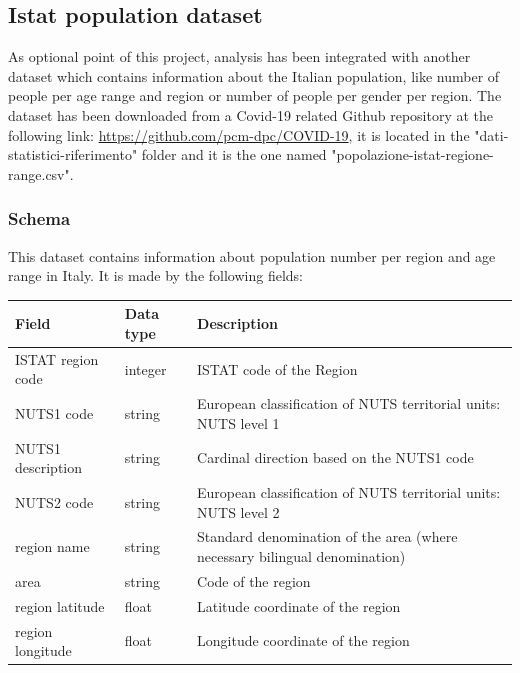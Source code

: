 \documentclass{article}
\begin{document}

\newpage
\subsection{Istat population dataset}
As optional point of this project, analysis has been integrated with another dataset which contains information about the Italian population, like number of people per age range and region or number of people per gender per region. The dataset has been downloaded from a Covid-19 related Github repository at the following link: \url{https://github.com/pcm-dpc/COVID-19}, it is located in the {\selectfont"dati-statistici-riferimento"} folder and it is the one named {\selectfont"popolazione-istat-regione-range.csv"}.

\subsubsection{Schema}
This dataset contains information about population number per region and age range in Italy. It is made by the following fields:
\hfill\break
\begin{center}
\begin{tabular}{ |m{4cm}|m{2cm}|m{4.5cm}|}
  \hline
  \bfseries{Field} & \bfseries{Data type} & \bfseries{Description} \\
  \hline\hline
  ISTAT region code & integer & ISTAT code of the Region\\
  \hline
  NUTS1 code & string & European classification of NUTS territorial units: NUTS level 1\\
    \hline
      NUTS1 description & string & Cardinal direction based on the NUTS1 code\\
    \hline
          NUTS2 code & string & European classification of NUTS territorial units: NUTS level 2\\
              \hline
                        region name & string & Standard denomination of the area (where necessary bilingual denomination)\\
                        \hline
          area & string & Code of the region\\
                        \hline
          region latitude & float & Latitude coordinate of the region\\
                        \hline
          region longitude & float & Longitude coordinate of the region\\
    \hline

\end{tabular}
\end{center}
\end{document}
